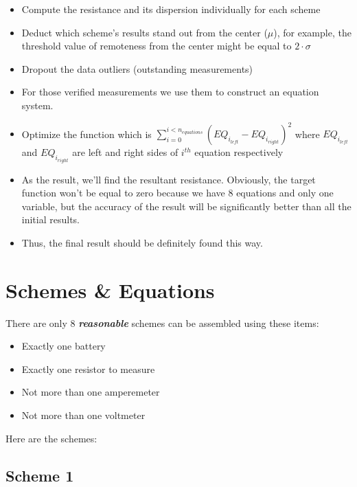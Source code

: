 \documentclass[11pt]{memoir}
\begin{document}
    \begin{itemize}
        \item Compute the resistance and its dispersion individually for each scheme
        \item Deduct which scheme's results stand out from the center ($\mu$), for example, the threshold value of remoteness from the center might be equal to $2 \cdot \sigma$
        \item Dropout the data outliers (outstanding measurements)
        \item For those verified measurements we use them to construct an equation system.
        \item Optimize the function which is ${\sum_{i=0}^{i<n_{equations}} (EQ_{i_{left}} - EQ_{i_{right}}) ^ 2}$\newline
            where $EQ_{i_{left}}$ and $EQ_{i_{right}}$ are left and right sides of $i^{th}$ equation respectively
        \item As the result, we'll find the resultant resistance.\newline
        Obviously, the target function won't be equal to zero because we have 8 equations and only one variable, but the accuracy of the result will be significantly better than all the initial results.
        \item Thus, the final result should be definitely found this way.
    \end{itemize}

\section{Schemes & Equations}\label{sec:schemes-&-equations}
    There are only 8 \textit{\textbf{reasonable}} schemes can be assembled using these items:
    \begin{itemize}
        \item Exactly one battery
        \item Exactly one resistor to measure
        \item Not more than one amperemeter
        \item Not more than one voltmeter
    \end{itemize}

    Here are the schemes:

    \subsection{Scheme 1}\label{subsec:scheme-1}



\end{document}
